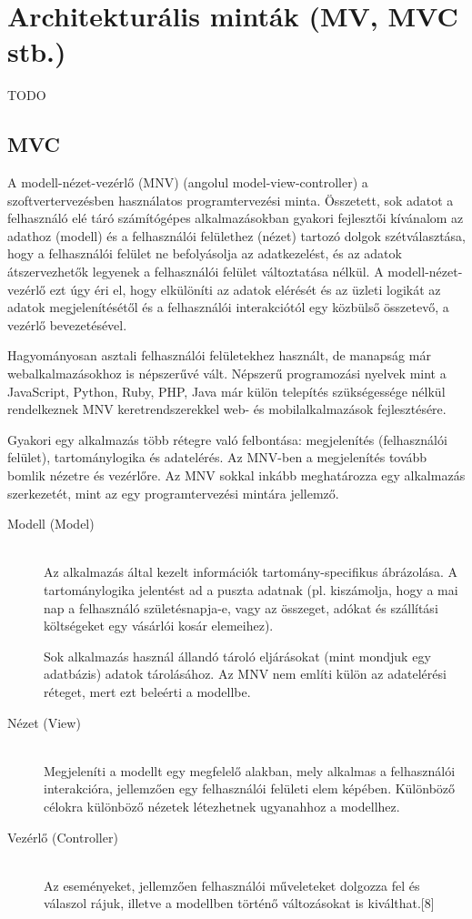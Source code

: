 \documentclass[margin=0px]{article}
\begin{document}
\section{Architekturális minták (MV, MVC stb.)}
TODO 

\subsection{MVC}
A modell-nézet-vezérlő (MNV) (angolul model-view-controller) a szoftvertervezésben használatos programtervezési minta. Összetett, sok adatot a felhasználó elé táró számítógépes alkalmazásokban gyakori fejlesztői kívánalom az adathoz (modell) és a felhasználói felülethez (nézet) tartozó dolgok szétválasztása, hogy a felhasználói felület ne befolyásolja az adatkezelést, és az adatok átszervezhetők legyenek a felhasználói felület változtatása nélkül. A modell-nézet-vezérlő ezt úgy éri el, hogy elkülöníti az adatok elérését és az üzleti logikát az adatok megjelenítésétől és a felhasználói interakciótól egy közbülső összetevő, a vezérlő bevezetésével.

Hagyományosan asztali felhasználói felületekhez használt, de manapság már webalkalmazásokhoz is népszerűvé vált. Népszerű programozási nyelvek mint a JavaScript, Python, Ruby, PHP, Java már külön telepítés szükségessége nélkül rendelkeznek MNV keretrendszerekkel web- és mobilalkalmazások fejlesztésére.

Gyakori egy alkalmazás több rétegre való felbontása: megjelenítés (felhasználói felület), tartománylogika és adatelérés. Az MNV-ben a megjelenítés tovább bomlik nézetre és vezérlőre. Az MNV sokkal inkább meghatározza egy alkalmazás szerkezetét, mint az egy programtervezési mintára jellemző.
\begin{description}
    \item[Modell (Model)] \hfill \\
        Az alkalmazás által kezelt információk tartomány-specifikus ábrázolása. A tartománylogika jelentést ad a puszta adatnak (pl. kiszámolja, hogy a mai nap a felhasználó születésnapja-e, vagy az összeget, adókat és szállítási költségeket egy vásárlói kosár elemeihez).

        Sok alkalmazás használ állandó tároló eljárásokat (mint mondjuk egy adatbázis) adatok tárolásához. Az MNV nem említi külön az adatelérési réteget, mert ezt beleérti a modellbe.
    \item[Nézet (View)] \hfill \\
        Megjeleníti a modellt egy megfelelő alakban, mely alkalmas a felhasználói interakcióra, jellemzően egy felhasználói felületi elem képében. Különböző célokra különböző nézetek létezhetnek ugyanahhoz a modellhez.
    \item[Vezérlő (Controller)] \hfill \\
        Az eseményeket, jellemzően felhasználói műveleteket dolgozza fel és válaszol rájuk, illetve a modellben történő változásokat is kiválthat.[8]
\end{description}
\end{document}
